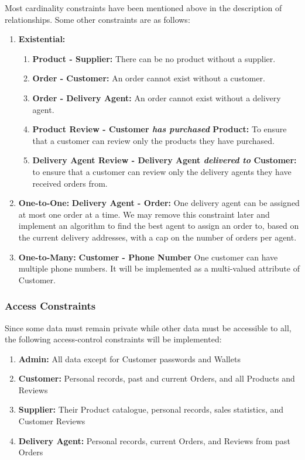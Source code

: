 \documentclass[12pt]{report}
\begin{document}
    Most cardinality constraints have been mentioned above in the description of relationships.
    Some other constraints are as follows:
    \begin{enumerate}
        \item \textbf{Existential:}
        \begin{enumerate}
            \item \textbf{Product - Supplier:} There can be no product without a supplier.
            \item \textbf{Order - Customer:} An order cannot exist without a customer.
            \item \textbf{Order - Delivery Agent:} An order cannot exist without a delivery agent.
            \item \textbf{Product Review - Customer \textit{has purchased} Product:} To ensure that a customer can review only the products they have purchased.
            \item \textbf{Delivery Agent Review - Delivery Agent \textit{delivered to} Customer:} to ensure that a customer can review only
            the delivery agents they have received orders from.
        \end{enumerate}
        \item \textbf{One-to-One:}
        \textbf{Delivery Agent - Order:} One delivery agent can be assigned at most one order at a time.
        We may remove this constraint later and implement an algorithm to find the best agent to assign an order to, based on the current delivery addresses,
        with a cap on the number of orders per agent.
        \item \textbf{One-to-Many:}
        \textbf{Customer - Phone Number} One customer can have multiple phone numbers.
        It will be implemented as a multi-valued attribute of Customer.
    \end{enumerate}

    \subsubsection*{Access Constraints}
    Since some data must remain private while other data must be accessible to all, the following access-control constraints will be implemented:
    \begin{enumerate}
        \item \textbf{Admin:} All data except for Customer passwords and Wallets
        \item \textbf{Customer:} Personal records, past and current Orders, and all Products and Reviews
        \item \textbf{Supplier:} Their Product catalogue, personal records, sales statistics, and Customer Reviews
        \item \textbf{Delivery Agent:} Personal records, current Orders, and Reviews from past Orders
    \end{enumerate}
\end{document}
